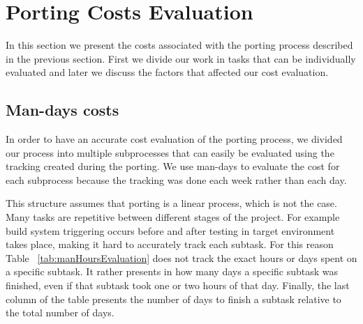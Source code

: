 \section{Porting Costs Evaluation}

%
%
%

In this section we present the costs associated with the porting process
described in the previous section. First we divide our work in tasks that can
be individually evaluated and later we discuss the factors that affected our
cost evaluation.

\subsection{Man-days costs}

In order to have an accurate cost evaluation of the porting process, we divided
our process into multiple subprocesses that can easily be evaluated using the
tracking created during the porting. We use man-days to evaluate the
cost for each subprocess because the tracking was done each week rather than
each day.

This structure assumes that porting is a linear process, which is not the case.
Many tasks are repetitive between different stages of the project. For example
build system triggering occurs before and after testing in target environment takes place,
making it hard to accurately track each subtask. For this reason Table
~\ref{tab:manHoursEvaluation} does not track the exact hours or days spent
on a specific subtask. It rather presents in how many days a specific subtask
was finished, even if that subtask took one or two hours of that day. Finally,
the last column of the table presents the number of days to finish a subtask
relative to the total number of days.

